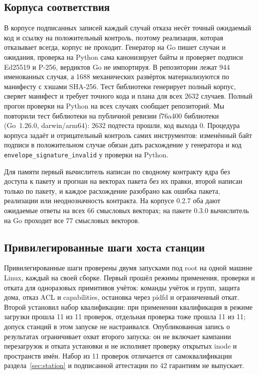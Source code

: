 \documentclass[10pt,a4paper]{article}
\begin{document}
\subsection{Корпуса соответствия}

В корпусе подписанных записей каждый случай отказа несёт точный ожидаемый код и ссылку на положительный контроль, поэтому реализация, которая отказывает всегда, корпус не проходит. Генератор на Go пишет случаи и ожидания, проверка на Python сама канонизирует байты и проверяет подписи Ed25519 и P-256, вердиктов Go не импортируя. В репозитории лежат 944 именованных случая, а 1688 механических развёрток материализуются по манифесту с хэшами SHA-256. Тест библиотеки генерирует полный корпус, сверяет манифест и требует точного кода и плана для всех 2632 случаев. Полный прогон проверки на Python на всех случаях сообщает репозиторий. Мы повторили тест библиотеки на публичной ревизии f76a400 библиотеки (Go~1.26.0, darwin/arm64): 2632 подтеста прошли, код выхода 0. Процедура корпуса задаёт и отрицательный контроль самих инструментов: изменённый байт подписи в положительном случае обязан дать расхождение у генератора и код \texttt{envelope\_signature\_invalid} у проверки на Python.

Для памяти первый вычислитель написан по сводному контракту ядра без доступа к пакету и прогнан на векторах пакета без их правки, второй написан только по пакету, и каждое расхождение разобрано как ошибка пакета, реализации или неоднозначность контракта. На корпусе 0.2.7 оба дают ожидаемые ответы на всех 66 смысловых векторах; на пакете 0.3.0 вычислитель на Go проходит все 77 смысловых векторов.

\subsection{Привилегированные шаги хоста станции}

Привилегированные шаги проверены двумя запусками под root на одной машине Linux, каждый на своей сборке. Первый прошёл режимы применения, проверки и отката для одноразовых примитивов учёток: команды учёток и групп, защита дома, отказ ACL и capabilities, остановка через pidfd и ограниченный откат. Второй установил набор квалификации: при применении квалификация в режиме загрузки прошла 11 из 11 проверок, отдельная проверка тоже прошла 11 из 11; допуск станций в этом запуске не настраивался. Опубликованная запись о результатах ограничивает охват второго запуска: он не включает кампании перезагрузок и отката установки и не исполняет проверку открытых inode и пространств имён. Набор из 11 проверок отличается от самоквалификации раздела~\ref{sec:station} и подписанной аттестации по 42 гарантиям не выпускает.
\end{document}
